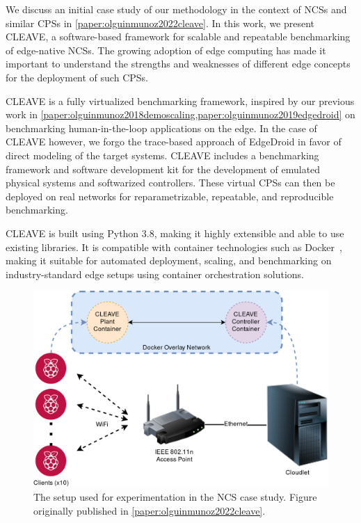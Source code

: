 We discuss an initial case study of our methodology in the context of \glspl{NCS} and similar \glspl{CPS} in \cref{paper:olguinmunoz2022cleave}.
In this work, we present \gls{CLEAVE}, a software-based framework for scalable and repeatable benchmarking of edge-native \aclp{NCS}.
The growing adoption of edge computing has made it important to understand the strengths and weaknesses of different edge concepts for the deployment of such \glspl{CPS}.

\gls{CLEAVE} is a fully virtualized benchmarking framework, inspired by our previous work in \cref{paper:olguinmunoz2018demoscaling,paper:olguinmunoz2019edgedroid} on benchmarking human-in-the-loop applications on the edge.
In the case of \gls{CLEAVE} however, we forgo the trace-based approach of EdgeDroid in favor of direct modeling of the target systems.
\gls{CLEAVE} includes a benchmarking framework and software development kit for the development of emulated physical systems and softwarized controllers.
These virtual \glspl{CPS} can then be deployed on real networks for reparametrizable, repeatable, and reproducible benchmarking.

\gls{CLEAVE} is built using Python 3.8, making it highly extensible and able to use existing libraries.
It is compatible with container technologies such as Docker~\cite{docker}, making it suitable for automated deployment, scaling, and benchmarking on industry-standard edge setups using container orchestration solutions.

\begin{figure}
    \centering
    \includegraphics[width=.9\textwidth]{publications/2022CLEAVE/images/CLEAVE_experiment_setup}
    \caption{
        The setup used for experimentation in the \gls{NCS} case study.
        Figure originally published in \cref{paper:olguinmunoz2022cleave}.
    }\label{fig:cleavesetup}
\end{figure}

